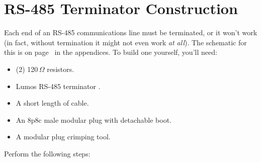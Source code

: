 \documentclass[letterpaper,twoside,onecolumn,openright,final]{memoir}
\begin{document}
\section{RS-485 Terminator Construction}\label{sec:terminator}
Each end of an RS-485 communications line must be terminated, or it won't work (in fact, without termination
it might not even work \emph{at all}).  The schematic for this is on page~\pageref{sch:terminator} in the 
appendices.  To build one yourself, you'll need:
\begin{itemize}
\item	(2) 120\,$\Omega$ resistors.
\item	Lumos RS-485 terminator .
\item	A short length of  cable.
\item	An 8p8c male modular plug with detachable boot.
\item	A modular plug crimping tool.
\end{itemize}
Perform the following steps:
\end{document}
